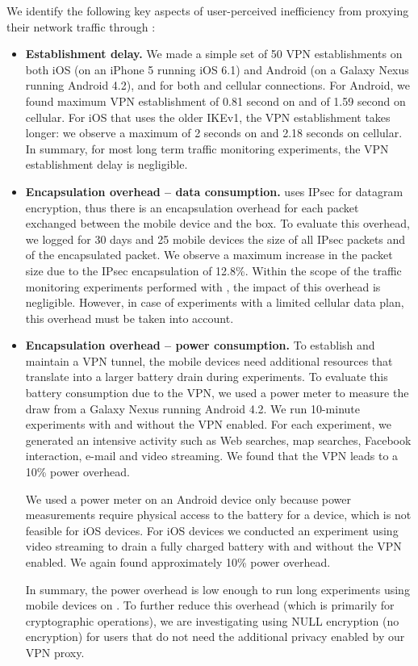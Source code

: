 We identify the following key aspects of user-perceived inefficiency from 
proxying their network traffic through \platname{}: 
\begin{itemize}
\item \textbf{Establishment delay.} We made a simple set of 50 VPN establishments on both iOS (on an
iPhone 5 running iOS 6.1) and Android (on a Galaxy Nexus running
Android 4.2), and for both \wifi{} and cellular connections. For
Android, we found maximum VPN establishment of 0.81 second on \wifi{}
and of 1.59 second on cellular. For iOS that uses the older IKEv1, the
VPN establishment takes longer: we observe a maximum of 2 seconds on
\wifi{} and 2.18 seconds on cellular.  In summary, for most long term
traffic monitoring experiments, the VPN establishment delay is
negligible. 
\item \textbf{Encapsulation overhead -- data consumption.} \platname{} uses IPsec for datagram encryption, thus there is
an encapsulation overhead for each packet exchanged between the mobile
device and the \platname{} box. To evaluate this overhead, we logged
for 30 days and 25 mobile devices the size of all IPsec packets and of
the encapsulated packet. We observe a maximum increase in the packet
size due to the IPsec encapsulation of 12.8\%. Within the scope of the
traffic monitoring experiments performed with \platname{}, the impact
of this overhead is negligible. However, in case of experiments with a
limited cellular data plan, this overhead must be taken into account.

\item \textbf{Encapsulation overhead -- power consumption.}
To establish and maintain a VPN tunnel, the mobile devices need
additional resources that translate into a larger battery drain during
experiments. To evaluate this battery consumption due to the VPN, we
used a power meter to measure the draw from a Galaxy Nexus running
Android 4.2. We run 10-minute experiments with and without the VPN
enabled. For each experiment, we generated an intensive activity such
as Web searches, map searches, Facebook interaction, e-mail and video
streaming. We found that the VPN leads to a 10\% power overhead. 

We used a power meter on an Android device only because power
measurements require physical access to the battery for a device,
which is not feasible for iOS devices. For iOS devices we conducted
an experiment using video streaming to drain a fully charged battery with 
and without the VPN enabled. We again found approximately 10\% power overhead. 

In summary, the power overhead is low enough to run long experiments
using mobile devices on \platname. To further reduce this overhead (which 
is primarily for cryptographic operations), we are investigating using NULL 
encryption (\ie no encryption) for users that do not need 
the additional privacy enabled by our VPN proxy.

\end{itemize}

